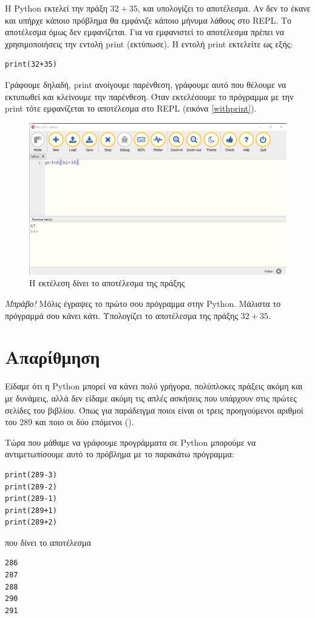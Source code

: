 Η Python εκτελεί την πράξη $32+35$, και υπολογίζει το αποτέλεσμα. Αν δεν το έκανε και υπήρχε κάποιο πρόβλημα θα εμφάνιζε κάποιο μήνυμα λάθους στο REPL. Το αποτέλεσμα όμως δεν εμφανίζεται. Για να εμφανιστεί το αποτέλεσμα πρέπει να χρησιμοποιήσεις την εντολή print (εκτύπωσε). Η εντολή print εκτελείτε ως εξής:
\begin{lstlisting}
print(32+35)
\end{lstlisting}
Γράφουμε δηλαδή, print ανοίγουμε παρένθεση, γράφουμε αυτό που θέλουμε να εκτυπωθεί και κλείνουμε την παρένθεση. Όταν εκτελέσουμε το πρόγραμμα με την print τότε εμφανίζεται το αποτέλεσμα στο REPL (εικόνα \ref{withprint}).
\begin{figure}
\includegraphics[width=\textwidth]{withprint.png}
\caption{Η εκτέλεση δίνει το αποτέλεσμα της πράξης}
\end{figure}
\emph{Μπράβο!} Μόλις έγραψες το πρώτο σου πρόγραμμα στην Python. Μάλιστα το πρόγραμμά σου κάνει κάτι. Υπολογίζει το αποτέλεσμα της πράξης $32+35$.

\section{Απαρίθμηση}
Είδαμε ότι η Python μπορεί να κάνει πολύ γρήγορα, πολύπλοκες πράξεις ακόμη και με δυνάμεις, αλλά δεν είδαμε ακόμη τις απλές ασκήσεις που υπάρχουν στις πρώτες σελίδες του βιβλίου. Όπως για παράδειγμα ποιοι είναι οι τρεις προηγούμενοι αριθμοί του 289 και ποιο οι δύο επόμενοι ().

Τώρα που μάθαμε να γράφουμε προγράμματα σε Python μπορούμε να αντιμετωπίσουμε αυτό το πρόβλημα με το παρακάτω πρόγραμμα:
\begin{lstlisting}
print(289-3)
print(289-2)
print(289-1)
print(289+1)
print(289+2)
\end{lstlisting}
που δίνει το αποτέλεσμα
\begin{lstlisting}
286
287
288
290
291
\end{lstlisting}

